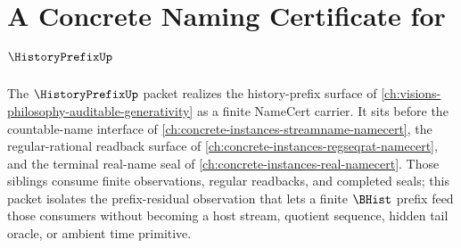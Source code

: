 \chapter{A Concrete Naming Certificate for $\HistoryPrefixUp$}
\label{ch:concrete-instances-historyprefix-namecert}

The $\HistoryPrefixUp$ packet realizes the history-prefix surface of \autoref{ch:visions-philosophy-auditable-generativity} as a finite NameCert carrier. It sits before the countable-name interface of \autoref{ch:concrete-instances-streamname-namecert}, the regular-rational readback surface of \autoref{ch:concrete-instances-regseqrat-namecert}, and the terminal real-name seal of \autoref{ch:concrete-instances-real-namecert}. Those siblings consume finite observations, regular readbacks, and completed seals; this packet isolates the prefix-residual observation that lets a finite $\BHist$ prefix feed those consumers without becoming a host stream, quotient sequence, hidden tail oracle, or ambient time primitive.



